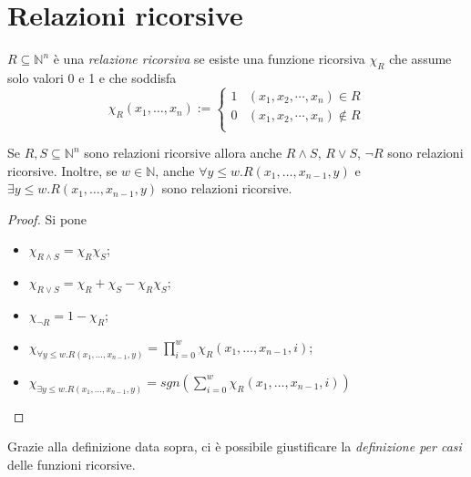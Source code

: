 \section{Relazioni ricorsive}
\begin{definizione} $R \subseteq \mathbb{N}^{n}$ è una \emph{relazione
ricorsiva} se esiste una funzione ricorsiva $\chi_R$ che assume solo valori 0 e
1 e che soddisfa
$$\chi_R(x_1, \ldots, x_n):= \left \{ \begin{array}{ll}
                                      1 & (x_{1}, x_{2}, \cdots, x_{n}) \in R\\
                                      0 & (x_{1}, x_{2}, \cdots, x_{n}) \not \in
 R\\
                                      \end{array} \right. $$
\end{definizione}
\begin{proposizione} Se $R, S \subseteq \mathbb{N}^{n}$ sono relazioni
ricorsive allora anche $R\land S$, $R \vee S$, $\neg R$ sono relazioni
ricorsive. Inoltre, se $w \in \mathbb{N}$, anche $\forall y \leq
w. R(x_1, \ldots, x_{n-1}, y)$ e $\exists y \leq w. R(x_1, \ldots,
x_{n-1}, y)$ sono relazioni ricorsive.
\end{proposizione}
\begin{proof} Si pone
\begin{itemize}
\item $\chi_{R\land S} = \chi_R \chi_S$;
\item $\chi_{R\vee S} = \chi_R + \chi_S - \chi_R  \chi_S$;
\item $\chi_{\neg R} = 1 - \chi_R$;
\item $\chi_{\forall y
\leq w. R(x_1, \ldots, x_{n-1}, y)} = \prod_{i=0}^{w} \chi_R(x_1, \ldots,
x_{n-1},i)$;
\item $\chi_{\exists y
\leq w. R(x_1, \ldots, x_{n-1}, y)} = sgn(\sum_{i=0}^{w} \chi_R(x_1, \ldots,
x_{n-1},i))$
\end{itemize}
\end{proof}

Grazie alla definizione data sopra, ci \`e possibile giustificare la
\emph{definizione per casi} delle funzioni ricorsive.

